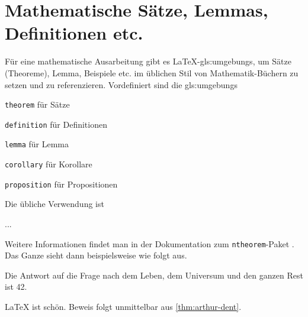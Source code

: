 \section{Mathematische Sätze, Lemmas, Definitionen etc.}%
\label{sec:Theoreme}
%
Für eine mathematische Ausarbeitung gibt es LaTeX-\glspl{gls:umgebung}, um
Sätze (Theoreme), Lemma,
Beispiele etc. im üblichen Stil von
Mathematik-Büchern zu setzen und zu referenzieren. Vordefiniert sind die
\glspl{gls:umgebung}
\begin{itemize*}
  \item \texttt{theorem} für Sätze
  \item \texttt{definition} für Definitionen
  \item \texttt{lemma} für Lemma
  \item \texttt{corollary} für Korollare
  \item \texttt{proposition} für Propositionen
\end{itemize*}
Die übliche Verwendung ist
\begin{latex}[caption={Beispiel für Theorem-Umgebungen},label={lst:ntheorem}]
\begin{theorem}\label{thm:my-theorem}
...
\end{theorem}
\end{latex}
Weitere Informationen findet man in der Dokumentation zum \texttt{ntheorem}-Paket
\parencite{May2011}. Das Ganze sieht dann beispielsweise wie folgt aus.

\begin{theorem}\label{thm:arthur-dent} Die Antwort auf
die Frage nach dem Leben, dem Universum und den ganzen Rest ist 42.
\end{theorem}

\begin{proposition} LaTeX ist schön. Beweis folgt
unmittelbar aus \cref{thm:arthur-dent}.
\end{proposition}